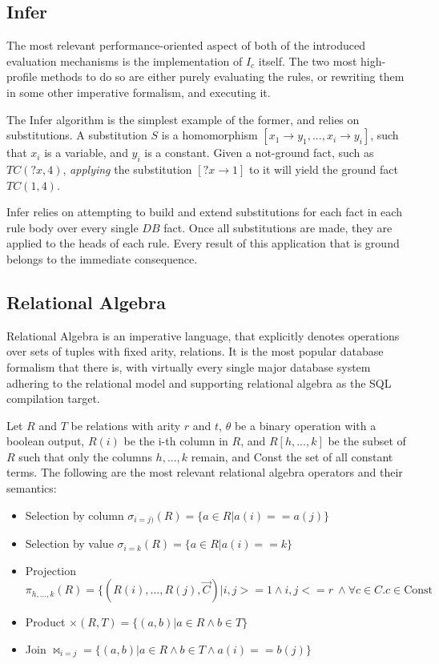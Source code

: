 \subsection{Infer}
The most relevant performance-oriented aspect of both of the introduced evaluation mechanisms is the implementation of $I_c$ itself. The two
most high-profile methods to do so are either purely evaluating the rules, or rewriting them in some other imperative formalism, and executing it.

The Infer\cite{datalog} algorithm is the simplest example of the former, and relies on substitutions. A substitution $S$ is a homomorphism
$[x_1 \rightarrow y_1, ..., x_i \rightarrow y_i]$, such that $x_i$ is a variable, and $y_i$ is a constant. Given a not-ground fact,
such as $TC(?x, 4)$, \textit{applying} the substitution $[?x \rightarrow 1]$ to it will yield the ground fact $TC(1, 4)$.

Infer relies on attempting to build and extend substitutions for each fact in each rule body over every single $DB$ fact. Once
all substitutions are made, they are applied to the heads of each rule. Every result of this application that is ground belongs
to the immediate consequence.

\subsection{Relational Algebra}
Relational Algebra\cite{codd_1970} is an imperative language, that explicitly denotes operations over sets of tuples with fixed arity, relations. It is
the most popular database formalism that there is, with virtually every single major database system adhering to the relational model\cite{pg,mysql,sqlserver}
and supporting relational algebra as the SQL compilation target.

Let $R$ and $T$ be relations with arity $r$ and $t$, $\theta$ be a binary operation with a boolean output, $R(i)$ be the i-th column in $R$, and
$R[h, ..., k]$ be the subset of $R$ such that only the columns $h, ..., k$ remain, and Const the set of all constant terms. The following
are the most relevant relational algebra operators and their semantics:
\begin{itemize}
	\item Selection by column $\sigma_{i=j)}(R) = \{ a \in R | a(i) == a(j) \}$
	\item Selection by value $\sigma_{i=k}(R) = \{a \in R | a(i) == k \}$
	\item Projection $\pi_{h, ..., k}(R) = \{(R(i), ..., R(j), \overrightarrow{C}) |  i, j >= 1 \wedge i, j <= r\ \wedge \forall c \in C. c \in \text{Const}$
	\item Product $\times(R, T) = \{(a, b) | a \in R \wedge b \in T \}$
	\item Join $\Join_{i=j} = \{(a, b) | a \in R \wedge b \in T \wedge a(i) == b(j)\}$
\end{itemize}

